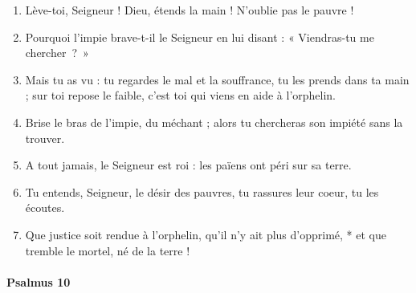 \documentclass[twoside]{article}
\begin{document}
\begin{paracol}[1]{2}
\begin{enumerate}[wide, itemsep=0mm, labelwidth=!, labelindent=0pt, label=\color{gregoriocolor}\theenumi]
\item Lève-toi, Seigneur ! Dieu, étends la main ! N'oublie pas le pauvre !
\item Pourquoi l'impie brave-t-il le Seigneur en lui disant : « Viendras-tu me cher\-cher~?~»
\item Mais tu as vu : tu regardes le mal et la souffrance, tu les prends dans ta main ; sur toi repose le faible, c'est toi qui viens en aide à l'orphelin.
\item Brise le bras de l'impie, du méchant ; alors tu chercheras son impiété sans la trouver.
\item A tout jamais, le Seigneur est roi : les païens ont péri sur sa terre.
\item Tu entends, Seigneur, le désir des pauvres, tu rassures leur coeur, tu les écoutes.
\item Que justice soit rendue à l'orphelin, qu'il n'y ait plus d'opprimé, * et que tremble le mortel, né de la terre !
\end{enumerate}

\switchcolumn*

\paragraph{Psalmus 10}



\end{paracol}
\end{document}
